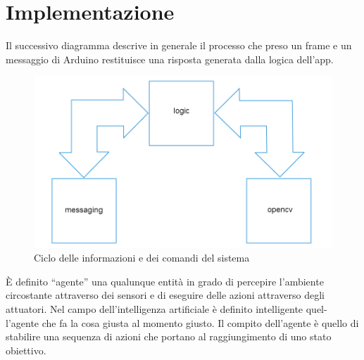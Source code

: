 \chapter{Implementazione}
\fancyfoot[C]{\thepage }
Il successivo diagramma descrive in generale il processo che preso un frame e un messaggio
di Arduino restituisce una risposta generata dalla logica dell'app.
\begin{figure}[H] \center
\includegraphics[scale=0.2]{immagini/package_diagram.png}
\caption{Ciclo delle informazioni e dei comandi del sistema} 
\end{figure}




È definito ``agente'' una qualunque entità in grado di percepire l'ambiente
circostante attraverso dei sensori e di eseguire delle azioni attraverso degli
attuatori. Nel campo dell'intelligenza artificiale è definito intelligente quel-
l'agente che fa la cosa giusta al momento giusto. Il compito dell'agente è
quello di stabilire una sequenza di azioni che portano al raggiungimento di
uno stato obiettivo.\cite{agente}
